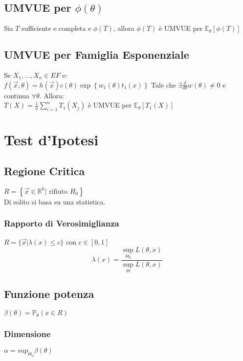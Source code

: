 \documentclass[a4paper,notitlepage]{report}%
\newcommand{\R}{\mathbb{R}}%
\newcommand{\p}{\mathbb{P}} %
\newcommand{\E}{\mathbb{E}} %
\begin{document}
\begin{multicols*}{2}
    \subsection*{UMVUE per $\phi(\theta)$}
    Sia $T$ sufficiente e completa e $\phi(T)$, allora
    $\phi(T)$ è UMVUE per $\E_\theta[\phi(T)]$


    \subsection*{UMVUE per Famiglia Esponenziale}
    Se $X_1,\dots,X_n\in EF$ e: \\
    $f(\vec{x},\theta) = h(\vec{x}) c(\theta) \exp\left\{ w_1(\theta) t_1(x) \right\}$
    Tale che 
    $\exists \frac{d}{d\theta} w(\theta) \neq 0$
    e continua $\forall\theta$. Allora:\\
    $T(X) = \frac{1}{n} \sum_{i=1}^n T_1(X_j)$ è UMVUE
    per $\E_\theta[T_1(X)]$


\section*{Test d'Ipotesi}


    \subsection*{Regione Critica}
    $R= \left\{ \vec{x}\in\R^k | \text{ rifiuto } H_0  \right\}$ \\
    Di solito si basa su una statistica.

        \subsubsection*{Rapporto di Verosimiglianza}
        $R = \{ \vec{x} | \lambda(x) \leq c \}$ con $c\in[0,1]$
        \[
            \lambda(x) = \frac{ \sup_{\Theta_0} L(\theta, x) }{ \sup_{\Theta} L(\theta, x) }    
        \]


    \subsection*{Funzione potenza}
    $\beta(\theta) = \p_\theta(x\in R)$

        \subsubsection*{Dimensione}
        $\alpha = sup_{\Theta_0} \beta(\theta)$


\end{multicols*}
\end{document}
